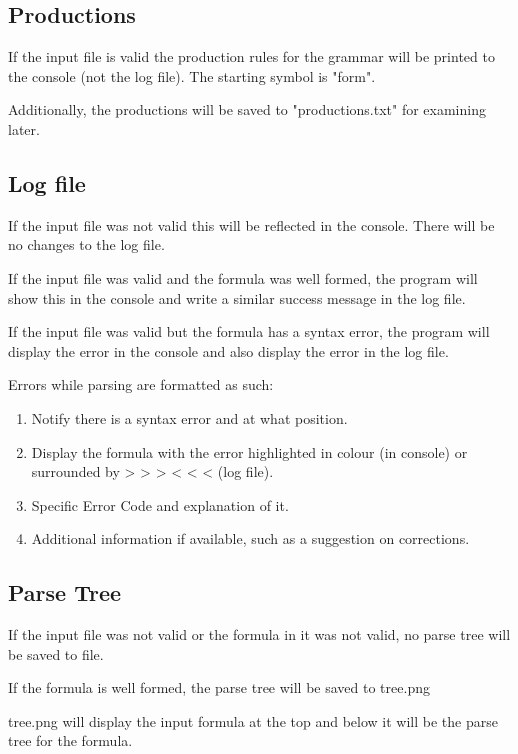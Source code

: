 \documentclass[11pt,a4paper]{article}
\begin{document}
\subsection{Productions}
If the input file is valid the production rules for the grammar will be printed to the console (not the log file). The starting symbol is "form".

Additionally, the productions will be saved to "productions.txt" for examining later.

\subsection{Log file}

If the input file was not valid this will be reflected in the console. There will be no changes to the log file.

If the input file was valid and the formula was well formed, the program will show this in the console and write a similar success message in the log file.

If the input file was valid but the formula has a syntax error, the program will display the error in the console and also display the error in the log file.

Errors while parsing are formatted as such:
\begin{enumerate}
    \item Notify there is a syntax error and at what position.
    \item Display the formula with the error highlighted in colour (in console) or surrounded by > > > < < < (log file).
    \item Specific Error Code and explanation of it.
    \item Additional information if available, such as a suggestion on corrections.
\end{enumerate}

\subsection{Parse Tree}

If the input file was not valid or the formula in it was not valid, no parse tree will be saved to file.

If the formula is well formed, the parse tree will be saved to tree.png

tree.png will display the input formula at the top and below it will be the parse tree for the formula.
\end{document}

